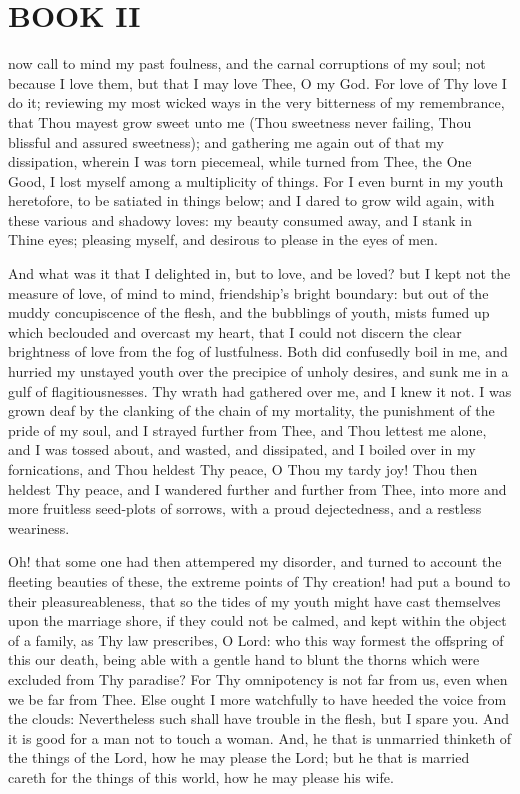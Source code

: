 \documentclass[b5paper,openright,12pt,twoside]{book}
\begin{document}
\chapter{BOOK II}


 now call to mind my past foulness, and the carnal corruptions of
my soul; not because I love them, but that I may love Thee, O my God.
For love of Thy love I do it; reviewing my most wicked ways in the very
bitterness of my remembrance, that Thou mayest grow sweet unto me (Thou
sweetness never failing, Thou blissful and assured sweetness); and
gathering me again out of that my dissipation, wherein I was torn
piecemeal, while turned from Thee, the One Good, I lost myself among a
multiplicity of things. For I even burnt in my youth heretofore, to be
satiated in things below; and I dared to grow wild again, with these
various and shadowy loves: my beauty consumed away, and I stank in Thine
eyes; pleasing myself, and desirous to please in the eyes of men.

And what was it that I delighted in, but to love, and be loved? but
I kept not the measure of love, of mind to mind, friendship's bright
boundary: but out of the muddy concupiscence of the flesh, and the
bubblings of youth, mists fumed up which beclouded and overcast my
heart, that I could not discern the clear brightness of love from the
fog of lustfulness. Both did confusedly boil in me, and hurried my
unstayed youth over the precipice of unholy desires, and sunk me in a
gulf of flagitiousnesses. Thy wrath had gathered over me, and I knew it
not. I was grown deaf by the clanking of the chain of my mortality, the
punishment of the pride of my soul, and I strayed further from Thee,
and Thou lettest me alone, and I was tossed about, and wasted, and
dissipated, and I boiled over in my fornications, and Thou heldest Thy
peace, O Thou my tardy joy! Thou then heldest Thy peace, and I wandered
further and further from Thee, into more and more fruitless seed-plots
of sorrows, with a proud dejectedness, and a restless weariness.

Oh! that some one had then attempered my disorder, and turned to account
the fleeting beauties of these, the extreme points of Thy creation! had
put a bound to their pleasureableness, that so the tides of my youth
might have cast themselves upon the marriage shore, if they could not be
calmed, and kept within the object of a family, as Thy law prescribes,
O Lord: who this way formest the offspring of this our death, being
able with a gentle hand to blunt the thorns which were excluded from Thy
paradise? For Thy omnipotency is not far from us, even when we be far
from Thee. Else ought I more watchfully to have heeded the voice from
the clouds: Nevertheless such shall have trouble in the flesh, but I
spare you. And it is good for a man not to touch a woman. And, he that
is unmarried thinketh of the things of the Lord, how he may please the
Lord; but he that is married careth for the things of this world, how he
may please his wife.
\end{document}
